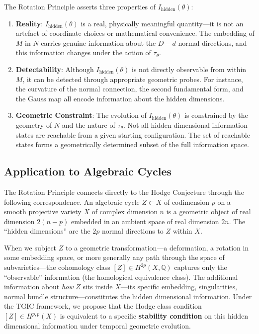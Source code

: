 \documentclass[11pt,a4paper]{article}
\theoremstyle{definition}
\theoremstyle{plain}
\newcommand{\QQ}{\mathbb{Q}}
\begin{document}
The Rotation Principle asserts three properties of $I_{\mathrm{hidden}}(\theta)$:

\begin{enumerate}[label=\textbf{RP\arabic*:}]
\item \textbf{Reality}: $I_{\mathrm{hidden}}(\theta)$ is a real, physically meaningful quantity---it is not an artefact of coordinate choices or mathematical convenience. The embedding of $M$ in $N$ carries genuine information about the $D - d$ normal directions, and this information changes under the action of $\tau_\theta$.

\item \textbf{Detectability}: Although $I_{\mathrm{hidden}}(\theta)$ is not directly observable from within $M$, it can be detected through appropriate geometric probes. For instance, the curvature of the normal connection, the second fundamental form, and the Gauss map all encode information about the hidden dimensions.

\item \textbf{Geometric Constraint}: The evolution of $I_{\mathrm{hidden}}(\theta)$ is constrained by the geometry of $N$ and the nature of $\tau_\theta$. Not all hidden dimensional information states are reachable from a given starting configuration. The set of reachable states forms a geometrically determined subset of the full information space.
\end{enumerate}

\subsection{Application to Algebraic Cycles}

The Rotation Principle connects directly to the Hodge Conjecture through the following correspondence. An algebraic cycle $Z \subset X$ of codimension $p$ on a smooth projective variety $X$ of complex dimension $n$ is a geometric object of real dimension $2(n-p)$ embedded in an ambient space of real dimension $2n$. The ``hidden dimensions'' are the $2p$ normal directions to $Z$ within $X$.

When we subject $Z$ to a geometric transformation---a deformation, a rotation in some embedding space, or more generally any path through the space of subvarieties---the cohomology class $[Z] \in H^{2p}(X, \QQ)$ captures only the ``observable'' information (the homological equivalence class). The additional information about \emph{how} $Z$ sits inside $X$---its specific embedding, singularities, normal bundle structure---constitutes the hidden dimensional information. Under the TGIC framework, we propose that the Hodge class condition $[Z] \in H^{p,p}(X)$ is equivalent to a specific \textbf{stability condition} on this hidden dimensional information under temporal geometric evolution.
\end{document}
